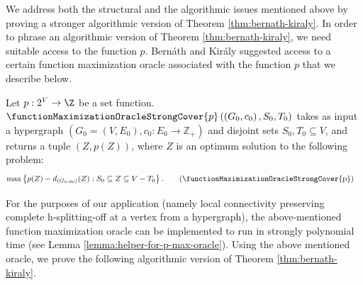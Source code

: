 We address both the structural and the algorithmic issues mentioned above by proving a stronger algorithmic 
version of Theorem \ref{thm:bernath-kiraly}. 
In order to phrase an algorithmic version of Theorem \ref{thm:bernath-kiraly}, we need suitable access to the function $p$. Bern\'{a}th and Kir\'{a}ly \cite{Bernath-Kiraly} suggested access to a certain function maximization oracle associated with the function $p$ that we describe below. 

\begin{definition}
    Let $p: 2^V\rightarrow \Z$ be a set function.    $\functionMaximizationOracleStrongCover{p}\left(\left(G_0, c_0\right), S_0, T_0\right)$ takes as input a hypergraph $(G_0=(V, E_0), c_0: E_0\rightarrow \mathbb{Z}_{+})$ and disjoint sets $S_0, T_0\subseteq V$, and returns a tuple $(Z, p(Z))$, where $Z$ is an optimum solution to the following problem:
        \begin{align*}
        \max & \left\{p(Z)-d_{(G_0, c_0)}(Z): S_0\subseteq Z\subseteq V-T_0\right\}. \tag{\functionMaximizationOracleStrongCover{p}}\label{tag:maximization-oracle-strong-cover}
        \end{align*}
\end{definition}
For the purposes of our application (namely local connectivity preserving complete h-splitting-off at a vertex from a hypergraph), the above-mentioned function maximization oracle can be implemented to run in strongly polynomial time (see Lemma \ref{lemma:helper-for-p-max-oracle}). Using the above mentioned oracle, we prove the following algorithmic version of Theorem \ref{thm:bernath-kiraly}.

